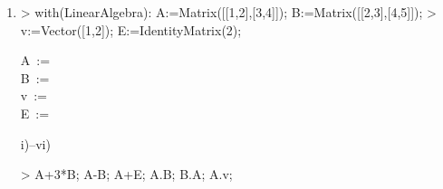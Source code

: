 \begin{enumerate}
\item

\begin{MapleInput}
> with(LinearAlgebra): A:=Matrix([[1,2],[3,4]]); B:=Matrix([[2,3],[4,5]]);
> v:=Vector([1,2]); E:=IdentityMatrix(2);
\end{MapleInput}
\begin{MapleOutputGather}
A\, := \, \left[ \begin {array}{cc} 1&2\\ 3&4\end {array} \right] \notag \\
B\, := \, \left[ \begin {array}{cc} 2&3\\ 4&5\end {array} \right] \notag \\
v\, := \, \left[ \begin {array}{c} 1\\ 2\end {array} \right] \notag \\
E\, := \, \left[ \begin {array}{cc} 1&0\\ 0&1\end {array} \right] \notag
\end{MapleOutputGather}
i)--vi)
\begin{MapleInput}
> A+3*B; A-B; A+E; A.B; B.A; A.v;
\end{MapleInput}
\begin{MapleOutputGather}
\left[ \begin {array}{cc} 7&11\\ 15&19\end {array} \right] \notag \\
\left[ \begin {array}{cc} -1&-1\\ -1&-1\end {array} \right] \notag \\
\left[ \begin {array}{cc} 2&2\\ 3&5\end {array} \right] \notag \\
\left[ \begin {array}{cc} 10&13\\ 22&29\end {array} \right] \notag \\
\left[ \begin {array}{cc} 11&16\\ 19&28\end {array} \right] \notag \\

\end{MapleOutputGather}
\end{enumerate}
